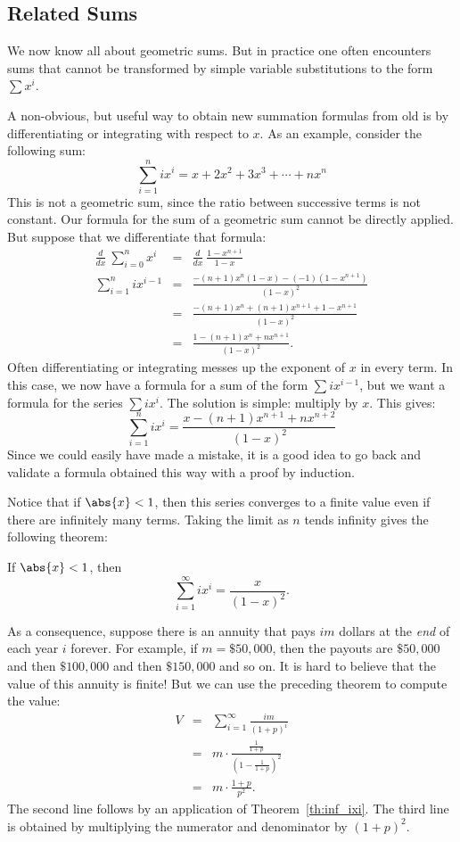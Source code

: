 \begin{editingnotes}
\subsection{Related Sums}

We now know all about geometric sums.  But in practice one often
encounters sums that cannot be transformed by simple variable
substitutions to the form $\sum x^i$.

A non-obvious, but useful way to obtain new summation formulas from
old is by differentiating or integrating with respect to $x$.  As an
example, consider the following sum:
\[
\sum_{i=1}^n i x^i = x + 2 x^2 + 3 x^3 + \cdots + n x^n
\]
This is not a geometric sum, since the ratio between successive
terms is not constant.  Our formula for the sum of a geometric sum
cannot be directly applied.  But suppose that we differentiate that
formula:
\begin{eqnarray*}
\frac{d}{dx} \ \sum_{i=0}^{n} x^i
  & = & \frac{d}{dx} \ \frac{1 - x^{n+1}}{1 - x} \\
\sum_{i=1}^{n} i x^{i-1}
 & = & \frac{-(n+1)x^n (1-x) - (-1)(1-x^{n+1})}{(1 - x)^2} \\
 & = & \frac{-(n+1)x^n + (n+1)x^{n+1} + 1 - x^{n+1}}{(1 - x)^2} \\
 & = & \frac{1 - (n+1)x^n + n x^{n+1}}{(1 - x)^2}.
\end{eqnarray*}
Often differentiating or integrating messes up the exponent of $x$ in
every term.  In this case, we now have a formula for a sum of the
form $\sum i x^{i-1}$, but we want a formula for the series $\sum i
x^i$.  The solution is simple: multiply by $x$.  This gives:
\[
\sum_{i=1}^{n} i x^i = \frac{x - (n+1)x^{n+1} + n x^{n+2}}{(1 - x)^2}
\]
Since we could easily have made a mistake, it is a good idea to go
back and validate a formula obtained this way with a proof by
induction.

Notice that if $\abs{x} < 1$, then this series converges to a finite value
even if there are infinitely many terms.  Taking the limit as $n$ tends
infinity gives the following theorem:
\begin{theorem}\label{th:inf_ixi}
If $\abs{x} < 1$, then
\[
\sum_{i=1}^\infty i x^i = \frac{x}{(1-x)^2}.
\]
\end{theorem}

As a consequence, suppose there is an annuity that pays $im$ dollars
at the {\em end} of each year $i$ forever.  For example, if $m =
\$50,000$, then the payouts are $\$50,000$ and then $\$100,000$ and
then $\$150,000$ and so on.  It is hard to believe that the value of
this annuity is finite!  But we can use the preceding theorem to
compute the value:
\begin{eqnarray*}
V & = & \sum_{i=1}^\infty \frac{im}{(1+p)^i} \\
  & = & m \cdot \frac{\frac{1}{1+p}}{(1 - \frac{1}{1+p})^2} \\
  & = & m \cdot \frac{1+p}{p^2}.
\end{eqnarray*}
The second line follows by an application of Theorem~\ref{th:inf_ixi}.
The third line is obtained by multiplying the numerator and
denominator by $(1+p)^2$.


\end{editingnotes}
